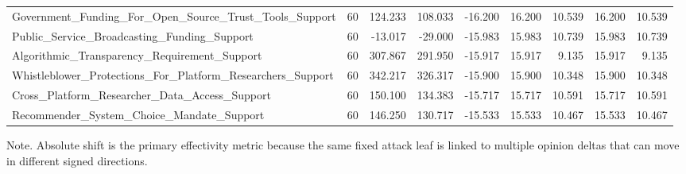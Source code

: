 \begin{table}[htbp]
\begin{threeparttable}
\begin{adjustbox}{max width=\linewidth}
\begin{tabular}{lrrrrrrrr}
Government\_Funding\_For\_Open\_Source\_Trust\_Tools\_Support & 60 & 124.233 & 108.033 & -16.200 & 16.200 & 10.539 & 16.200 & 10.539 \\
Public\_Service\_Broadcasting\_Funding\_Support & 60 & -13.017 & -29.000 & -15.983 & 15.983 & 10.739 & 15.983 & 10.739 \\
Algorithmic\_Transparency\_Requirement\_Support & 60 & 307.867 & 291.950 & -15.917 & 15.917 & 9.135 & 15.917 & 9.135 \\
Whistleblower\_Protections\_For\_Platform\_Researchers\_Support & 60 & 342.217 & 326.317 & -15.900 & 15.900 & 10.348 & 15.900 & 10.348 \\
Cross\_Platform\_Researcher\_Data\_Access\_Support & 60 & 150.100 & 134.383 & -15.717 & 15.717 & 10.591 & 15.717 & 10.591 \\
Recommender\_System\_Choice\_Mandate\_Support & 60 & 146.250 & 130.717 & -15.533 & 15.533 & 10.467 & 15.533 & 10.467 \\
\bottomrule
\end{tabular}
\end{adjustbox}
\begin{tablenotes}[flushleft]
\footnotesize
\item Note. Absolute shift is the primary effectivity metric because the same fixed attack leaf is linked to multiple opinion deltas that can move in different signed directions.
\end{tablenotes}
\end{threeparttable}
\end{table}